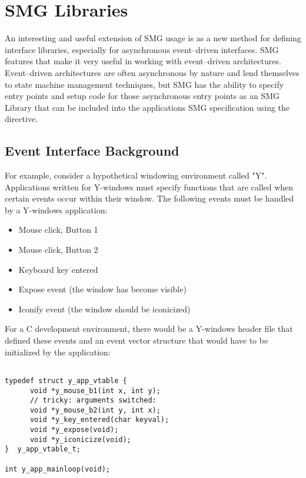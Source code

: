 \section{SMG Libraries}

An interesting and useful extension of SMG usage is as a new method
for defining interface libraries, especially for asynchronous
event--driven interfaces.  SMG features that make it very useful in
working with event--driven architectures.  Event--driven architectures
are often asynchronous by nature and lend themselves to state machine
management techniques, but SMG has the ability to specify entry points
and setup code for those asynchronous entry points as an SMG Library
that can be included into the applications SMG specification using the
\SMINCL directive.

\subsection{Event Interface Background}

For example, consider a hypothetical windowing environment called "Y".
Applications written for Y-windows must specify functions that are
called when certain events occur within their window.  The following
events must be handled by a Y-windows application:

\begin{itemize}
\item Mouse click, Button 1
\item Mouse click, Button 2
\item Keyboard key entered
\item Expose event (the window has become visible)
\item Iconify event (the window should be iconicized)
\end{itemize}

For a C development environment, there would be a Y-windows header file
that defined these events and an event vector structure that would have
to be initialized by the application:

\begin{verbatim}

typedef struct y_app_vtable {
      void *y_mouse_b1(int x, int y);
      // tricky: arguments switched:
      void *y_mouse_b2(int y, int x);
      void *y_key_entered(char keyval);
      void *y_expose(void);
      void *y_iconicize(void);
}  y_app_vtable_t;

int y_app_mainloop(void);

\end{verbatim}

